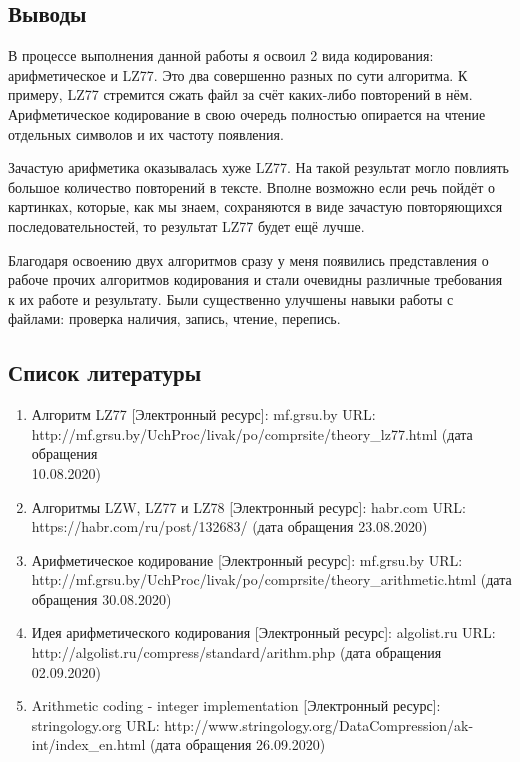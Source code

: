 \documentclass[12pt]{article}
\begin{document}
\subsection*{Выводы}

В процессе выполнения данной работы я освоил 2 вида кодирования: арифметическое и LZ77. Это два совершенно разных по сути алгоритма. К примеру, LZ77 стремится сжать файл за счёт каких-либо повторений в нём. Арифметическое кодирование в свою очередь полностью опирается на чтение отдельных символов и их частоту появления. 

Зачастую арифметика оказывалась хуже LZ77. На такой результат могло повлиять большое количество повторений в тексте. Вполне возможно если речь пойдёт о картинках, которые, как мы знаем, сохраняются в виде зачастую повторяющихся последовательностей, то результат LZ77 будет ещё лучше.

Благодаря освоению двух алгоритмов сразу у меня появились представления о рабоче прочих алгоритмов кодирования и стали очевидны различные требования к их работе и результату. Были существенно улучшены навыки работы с файлами: проверка наличия, запись, чтение, перепись.

\subsection*{Список литературы}
\begin{enumerate}
	\item Алгоритм LZ77 [Электронный ресурс]: mf.grsu.by URL:\\ http://mf.grsu.by/UchProc/livak/po/comprsite/theory\_lz77.html (дата обращения\\ 10.08.2020)
	\item Алгоритмы LZW, LZ77 и LZ78 [Электронный ресурс]: habr.com URL:\\ https://habr.com/ru/post/132683/ (дата обращения 23.08.2020)
	\item Арифметическое кодирование [Электронный ресурс]: mf.grsu.by URL:\\ http://mf.grsu.by/UchProc/livak/po/comprsite/theory\_arithmetic.html (дата обращения 30.08.2020)
	\item Идея арифметического кодирования [Электронный ресурс]: algolist.ru URL:\\ http://algolist.ru/compress/standard/arithm.php (дата обращения 02.09.2020)
	\item Arithmetic coding - integer implementation [Электронный ресурс]: stringology.org URL: http://www.stringology.org/DataCompression/ak-int/index\_en.html (дата обращения 26.09.2020)
\end{enumerate}
\end{document}
